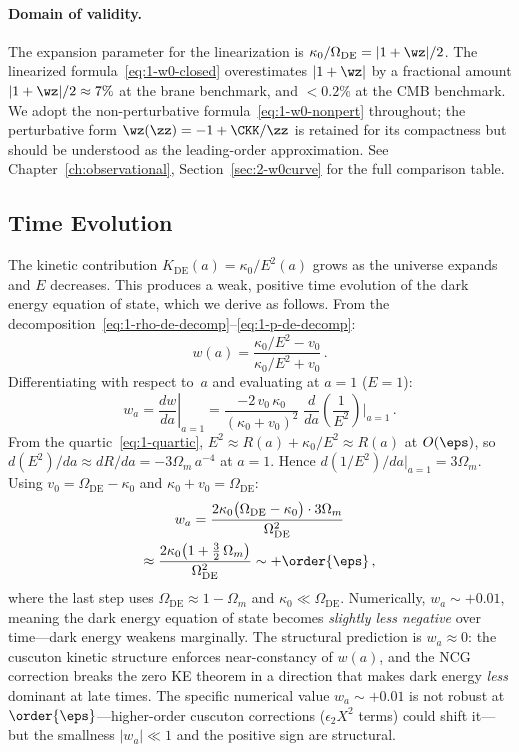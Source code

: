 \paragraph{Domain of validity.} The expansion parameter for the linearization is $\kappa_0/\Omega_{\mathrm{DE}} = |1+\wz|/2$. The linearized formula~\eqref{eq:1-w0-closed} overestimates $|1+\wz|$ by a fractional amount $|1+\wz|/2 \approx 7\%$ at the brane benchmark, and $< 0.2\%$ at the CMB benchmark. We adopt the non-perturbative formula~\eqref{eq:1-w0-nonpert} throughout; the perturbative form $\wz(\zz) = -1 + \CKK/\zz$ is retained for its compactness but should be understood as the leading-order approximation. See Chapter~\ref{ch:observational}, Section~\ref{sec:2-w0curve} for the full comparison table.

\subsection{Time Evolution}
\label{sec:1-time-evolution}

The kinetic contribution $K_{\mathrm{DE}}(a) = \kappa_0/E^2(a)$ grows as the universe expands and $E$ decreases. This produces a weak, positive time evolution of the dark energy equation of state, which we derive as follows. From the decomposition~\eqref{eq:1-rho-de-decomp}--\eqref{eq:1-p-de-decomp}:
\begin{equation}
w(a) = \frac{\kappa_0/E^2 - v_0}{\kappa_0/E^2 + v_0}\,.
\end{equation}
Differentiating with respect to~$a$ and evaluating at $a = 1$ ($E = 1$):
\begin{equation}
w_a = \left.\frac{dw}{da}\right|_{a=1} = \frac{-2\,v_0\,\kappa_0}{(\kappa_0 + v_0)^2}\;\frac{d}{da}\!\left(\frac{1}{E^2}\right)\bigg|_{a=1}\,.
\end{equation}
From the quartic~\eqref{eq:1-quartic}, $E^2 \approx R(a) + \kappa_0/E^2 \approx R(a)$ at $O(\eps)$, so $d(E^2)/da \approx dR/da = -3\Omega_m\,a^{-4}$ at $a=1$. Hence $d(1/E^2)/da|_{a=1} = 3\Omega_m$. Using $v_0 = \Omega_\mathrm{DE} - \kappa_0$ and $\kappa_0 + v_0 = \Omega_\mathrm{DE}$:
\begin{multline}
\label{eq:1-wa}
w_a = \frac{2\kappa_0\bigl(\Omega_\mathrm{DE} - \kappa_0\bigr)\cdot 3\Omega_m}{\Omega_{\mathrm{DE}}^2} \\
    \approx \frac{2\kappa_0\bigl(1 + \tfrac{3}{2}\,\Omega_m\bigr)}{\Omega_{\mathrm{DE}}^2} \sim +\order{\eps}\,,
\end{multline}
where the last step uses $\Omega_\mathrm{DE} \approx 1 - \Omega_m$ and $\kappa_0 \ll \Omega_\mathrm{DE}$.
Numerically, $w_a \sim +0.01$, meaning the dark energy equation of state becomes \emph{slightly less negative} over time---dark energy weakens marginally. The structural prediction is $w_a \approx 0$: the cuscuton kinetic structure enforces near-constancy of $w(a)$, and the NCG correction breaks the zero KE theorem in a direction that makes dark energy \emph{less} dominant at late times. The specific numerical value $w_a \sim +0.01$ is not robust at $\order{\eps}$---higher-order cuscuton corrections ($\epsilon_2 X^2$ terms) could shift it---but the smallness $|w_a| \ll 1$ and the positive sign are structural.

